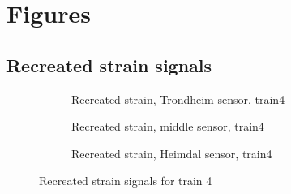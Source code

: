 %
%
\newpage
\section{Figures}
%
\subsection{Recreated strain signals}
\begin{figure}[h]
  \begin{subfigure}[t]{0.9\textwidth}
    \centering
    
    \caption{Recreated strain, Trondheim sensor, train4} %
    \label{recreated_sensor_trond_train4}
  \end{subfigure}
%
  \begin{subfigure}[t]{0.9\textwidth}
    \centering
    
    \caption{Recreated strain, middle sensor, train4} %
    \label{recreated_sensor_middle_train4}
  \end{subfigure}
%
  \begin{subfigure}[t]{0.9\textwidth}
    \centering
    
    \caption{Recreated strain, Heimdal sensor, train4} %
    \label{recreated_sensor_heimdal_train4}
  \end{subfigure}
%
  \caption{Recreated strain signals for train 4}
  \label{fig:recreated_strains_train4}
\end{figure}



